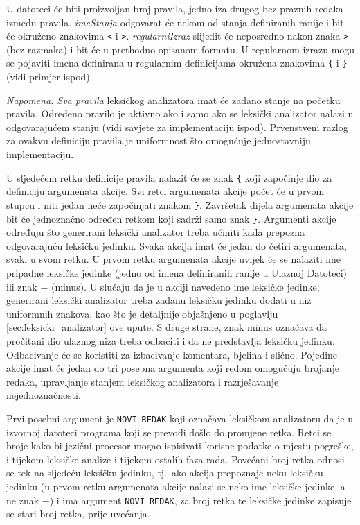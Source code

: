 \documentclass[times, 12pt, utf8]{book}
\begin{document}
U datoteci će biti proizvoljan broj pravila, jedno iza drugog bez praznih redaka između pravila.
\emph{imeStanja} odgovarat će nekom od stanja definiranih ranije i bit će okruženo znakovima \verb|<| i \verb|>|.
\emph{regularniIzraz} slijedit će neposredno nakon znaka \verb|>| (bez razmaka) i bit će u prethodno opisanom formatu.
U regularnom izrazu mogu se pojaviti imena definirana u regularnim definicijama okružena znakovima \verb|{| i \verb|}| (vidi primjer ispod).

\emph{Napomena: Sva pravila} leksičkog analizatora imat će zadano stanje na početku pravila.
Određeno pravilo je aktivno ako i samo ako se leksički analizator nalazi u odgovarajućem stanju (vidi savjete za implementaciju ispod).
Prvenstveni razlog za ovakvu definiciju pravila je uniformnost što omogućuje jednostavniju implementaciju.

U sljedećem retku definicije pravila nalazit će se znak \verb|{| koji započinje dio za definiciju argumenata akcije.
Svi retci argumenata akcije počet će u prvom stupcu i niti jedan neće započinjati znakom \verb|}|.
Završetak dijela argumenata akcije bit će jednoznačno određen retkom koji sadrži samo znak \verb|}|.
Argumenti akcije određuju što generirani leksički analizator treba učiniti kada prepozna odgovarajuću leksičku jedinku.
Svaka akcija imat će jedan do četiri argumenata, svaki u svom retku.
U prvom retku argumenata akcije uvijek će se nalaziti ime pripadne leksičke jedinke (jedno od imena definiranih ranije u Ulaznoj Datoteci) ili znak \(-\) (minus).
U slučaju da je u akciji navedeno ime leksičke jedinke, generirani leksički analizator treba zadanu leksičku jedinku dodati u niz uniformnih znakova, kao što je detaljnije objašnjeno u poglavlju \ref{sec:leksicki_analizator} ove upute.
S druge strane, znak minus označava da pročitani dio ulaznog niza treba odbaciti i da ne predstavlja leksičku jedinku.
Odbacivanje će se koristiti za izbacivanje komentara, bjelina i slično.
Pojedine akcije imat će jedan do tri posebna argumenta koji redom omogućuju brojanje redaka, upravljanje stanjem leksičkog analizatora i razrješavanje nejednoznačnosti.

Prvi posebni argument je \verb|NOVI_REDAK| koji označava leksičkom analizatoru da je u izvornoj datoteci programa koji se prevodi došlo do promjene retka.
Retci se broje kako bi jezični procesor mogao ispisivati korisne podatke o mjestu pogreške, i tijekom leksičke analize i tijekom ostalih faza rada.
Povećani broj retka odnosi se tek na sljedeću leksičku jedinku, tj.~ako akcija prepoznaje neku leksičku jedinku (u prvom retku argumenata akcije nalazi se neko ime leksičke jedinke, a ne znak \(-\)) i ima argument \verb|NOVI_REDAK|, za broj retka te leksičke jedinke zapisuje se stari broj retka, prije uvećanja.
\end{document}
